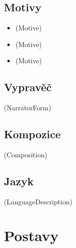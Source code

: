 \documentclass[a4paper,12pt]{article}
\begin{document}
        \subsection{Motivy}
            \noindent
            \begin{minipage}{0.3\textwidth}
            \begin{itemize}
                \renewcommand\labelitemi{--}
                \item (Motive)
            \end{itemize}
            \end{minipage}%
            \begin{minipage}{0.3\textwidth}
            \begin{itemize}
                \renewcommand\labelitemi{--}
                \item (Motive)
            \end{itemize}
            \end{minipage}%
            \begin{minipage}{0.3\textwidth}
            \begin{itemize}
                \renewcommand\labelitemi{--}
                \item (Motive)
            \end{itemize}
            \end{minipage}

        \subsection{Vypravěč}
            (NarratorForm)

        \subsection{Kompozice}
            (Composition)

        \subsection{Jazyk}
            (LanguageDescription)

    \section{Postavy}
\end{document}
